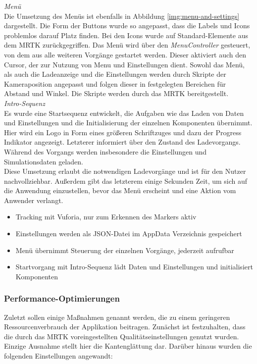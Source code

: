 \textit{Menü}\\
Die Umsetzung des Menüs ist ebenfalls in Abbildung \ref{img:menu-and-settings} dargestellt. Die Form der Buttons wurde so angepasst, dass die Labels und Icons problemlos darauf Platz finden. Bei den Icons wurde auf Standard-Elemente aus dem MRTK zurückgegriffen. Das Menü wird über den \textit{MenuController} gesteuert, von dem aus alle weiteren Vorgänge gestartet werden. Dieser aktiviert auch den Cursor, der zur Nutzung von Menu und Einstellungen dient. Sowohl das Menü, als auch die Ladeanzeige und die Einstellungen werden durch Skripte der Kameraposition angepasst und folgen dieser in festgelegten Bereichen für Abstand und Winkel. Die Skripte werden durch das MRTK bereitgestellt.\\

\textit{Intro-Sequenz}\\
Es wurde eine Startsequenz entwickelt, die Aufgaben wie das Laden von Daten und Einstellungen und die Initialisierung der einzelnen Komponenten übernimmt. Hier wird ein Logo in Form eines größeren Schriftzuges und dazu der Progress Indikator angezeigt. Letzterer informiert über den Zustand des Ladevorgangs. Während des Vorgangs werden insbesondere die Einstellungen und Simulationsdaten geladen.\\

Diese Umsetzung erlaubt die notwendigen Ladevorgänge und ist für den Nutzer nachvollziehbar. Außerdem gibt das letzterem einige Sekunden Zeit, um sich auf die Anwendung einzustellen, bevor das Menü erscheint und eine Aktion vom Anwender verlangt.

\begin{itemize}[rightmargin=12px, topsep=-12px]
	\setlength{\itemsep}{-1pt}
	\singlespacing
	\item Tracking mit Vuforia, nur zum Erkennen des Markers aktiv
	\item Einstellungen werden als JSON-Datei im AppData Verzeichnis gespeichert
	\item Menü übernimmt Steuerung der einzelnen Vorgänge, jederzeit aufrufbar
	\item Startvorgang mit Intro-Sequenz lädt Daten und Einstellungen und initialisiert Komponenten
\end{itemize}

\subsubsection{Performance-Optimierungen}
Zuletzt sollen einige Maßnahmen genannt werden, die zu einem geringeren Ressourcenverbrauch der Applikation beitragen. Zunächst ist festzuhalten, dass die durch das MRTK voreingestellten Qualitätseinstellungen genutzt wurden. Einzige Ausnahme stellt hier die Kantenglättung dar. Darüber hinaus wurden die folgenden Einstellungen angewandt:

